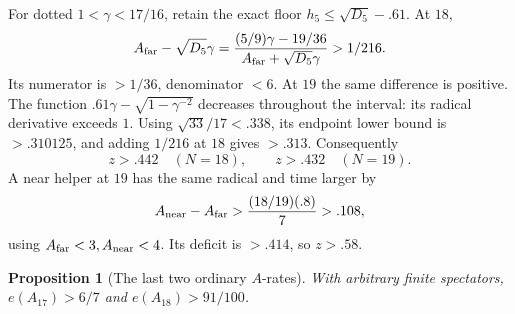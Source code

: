 \documentclass[11pt]{article}
\newtheorem{proposition}[theorem]{Proposition}
\theoremstyle{definition}
\theoremstyle{remark}
\begin{document}
For dotted \(1<\gamma<17/16\), retain the exact
floor \(h_5\leq\sqrt{D_5}-.61\).
At \(18\),
\[
 A_{\rm far}-\sqrt{D_5}\gamma=
 \frac{(5/9)\gamma-19/36}
      {A_{\rm far}+\sqrt{D_5}\gamma}>1/216.
\]
Its numerator is \(>1/36\), denominator \(<6\).
At \(19\) the same difference is positive.
The function \(.61\gamma-\sqrt{1-\gamma^{-2}}\)
decreases throughout the interval: its radical
derivative exceeds \(1\).
Using \(\sqrt{33}/17<.338\), its endpoint lower
bound is \(>.310125\), and adding \(1/216\)
at \(18\) gives \(>.313\).
Consequently
\[
 z>.442\quad(N=18),\qquad z>.432\quad(N=19).
\]
A near helper at \(19\) has the same radical and
time larger by
\[
 A_{\rm near}-A_{\rm far}>
 \frac{(18/19)(.8)}7>.108,
\]
using \(A_{\rm far}<3,A_{\rm near}<4\).
Its deficit is \(>.414\), so \(z>.58\).


\begin{proposition}[The last two ordinary \(A\)-rates]
\label{app:prop:A17A18}
With arbitrary finite spectators,
\(e(A_{17})>6/7\) and \(e(A_{18})>91/100\).
\end{proposition}
\end{document}
